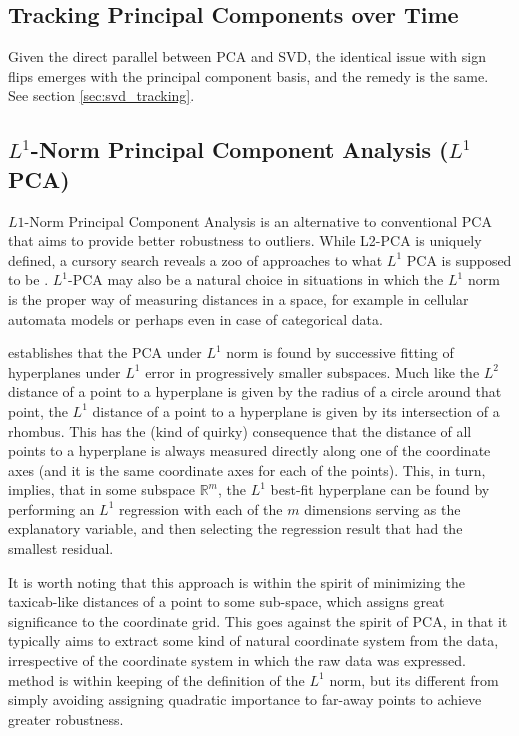 \subsection{Tracking Principal Components over Time}
Given the direct parallel between PCA and SVD, the identical issue with sign flips emerges with the principal component basis, and the remedy is the same. See section \ref{sec:svd_tracking}.


\subsection{$L^1$-Norm Principal Component Analysis ($L^1$ PCA)}
\label{sec:l1pca}

$L1$-Norm Principal Component Analysis is an alternative to conventional PCA that aims to provide better robustness to outliers. While L2-PCA is uniquely defined, a cursory search reveals a zoo of approaches to what $L^1$ PCA is supposed to be \cite{brooks2012pcal1}. $L^1$-PCA may also be a natural choice in situations in which the $L^1$ norm is the proper way of measuring distances in a space, for example in cellular automata models or perhaps even in case of categorical data. 

 establishes that the PCA under $L^1$ norm is found by successive fitting of hyperplanes under $L^1$ error in progressively smaller subspaces. Much like the $L^2$ distance of a point to a hyperplane is given by the radius of a circle around that point, the $L^1$ distance of a point to a hyperplane is given by its intersection of a rhombus. This has the (kind of quirky) consequence that the distance of all points to a hyperplane is always measured directly along one of the coordinate axes (and it is the same coordinate axes for each of the points). This, in turn, implies, that in some subspace $\mathbb{R}^m$, the $L^1$ best-fit hyperplane can be found by performing an $L^1$ regression with each of the $m$ dimensions serving as the explanatory variable, and then selecting the regression result that had the smallest residual. 

It is worth noting that this approach is within the spirit of minimizing the taxicab-like distances of a point to some sub-space, which assigns great significance to the coordinate grid. This goes against the spirit of PCA, in that it typically aims to extract some kind of natural coordinate system from the data, irrespective of the coordinate system in which the raw data was expressed.  method is within keeping of the definition of the $L^1$ norm, but its different from simply avoiding assigning quadratic importance to far-away points to achieve greater robustness.

